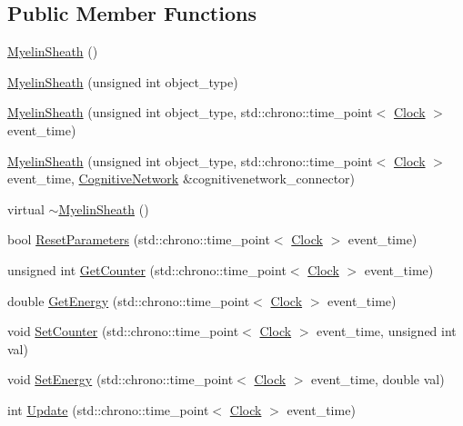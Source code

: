 \subsection*{Public Member Functions}
\begin{DoxyCompactItemize}
\item 
\mbox{\hyperlink{classMyelinSheath_a298d69acb8d64de018f32443ea015287}{Myelin\+Sheath}} ()
\item 
\mbox{\hyperlink{classMyelinSheath_a9f9f90c853f341b5cbf4f2c5035a14af}{Myelin\+Sheath}} (unsigned int object\+\_\+type)
\item 
\mbox{\hyperlink{classMyelinSheath_a34a80a57ebcde58933a07ca9d99780eb}{Myelin\+Sheath}} (unsigned int object\+\_\+type, std\+::chrono\+::time\+\_\+point$<$ \mbox{\hyperlink{universe_8h_a0ef8d951d1ca5ab3cfaf7ab4c7a6fd80}{Clock}} $>$ event\+\_\+time)
\item 
\mbox{\hyperlink{classMyelinSheath_aac107d8f22ca3c02f2d346f44950e6d0}{Myelin\+Sheath}} (unsigned int object\+\_\+type, std\+::chrono\+::time\+\_\+point$<$ \mbox{\hyperlink{universe_8h_a0ef8d951d1ca5ab3cfaf7ab4c7a6fd80}{Clock}} $>$ event\+\_\+time, \mbox{\hyperlink{classCognitiveNetwork}{Cognitive\+Network}} \&cognitivenetwork\+\_\+connector)
\item 
virtual \mbox{\hyperlink{classMyelinSheath_acf71a2a450e2df353f28eed6c7a4129a}{$\sim$\+Myelin\+Sheath}} ()
\item 
bool \mbox{\hyperlink{classMyelinSheath_af1174b93be36aa43506a4ba9857d92a4}{Reset\+Parameters}} (std\+::chrono\+::time\+\_\+point$<$ \mbox{\hyperlink{universe_8h_a0ef8d951d1ca5ab3cfaf7ab4c7a6fd80}{Clock}} $>$ event\+\_\+time)
\item 
unsigned int \mbox{\hyperlink{classMyelinSheath_a10eef8601d129e7e2f28e8ed1ebc975c}{Get\+Counter}} (std\+::chrono\+::time\+\_\+point$<$ \mbox{\hyperlink{universe_8h_a0ef8d951d1ca5ab3cfaf7ab4c7a6fd80}{Clock}} $>$ event\+\_\+time)
\item 
double \mbox{\hyperlink{classMyelinSheath_ac0c4142b6066e5982c54583e8ac01271}{Get\+Energy}} (std\+::chrono\+::time\+\_\+point$<$ \mbox{\hyperlink{universe_8h_a0ef8d951d1ca5ab3cfaf7ab4c7a6fd80}{Clock}} $>$ event\+\_\+time)
\item 
void \mbox{\hyperlink{classMyelinSheath_afb9cd377a71881558f48cf8bb226af77}{Set\+Counter}} (std\+::chrono\+::time\+\_\+point$<$ \mbox{\hyperlink{universe_8h_a0ef8d951d1ca5ab3cfaf7ab4c7a6fd80}{Clock}} $>$ event\+\_\+time, unsigned int val)
\item 
void \mbox{\hyperlink{classMyelinSheath_ad0f6dbae2819f6642a92b8e85ec8f775}{Set\+Energy}} (std\+::chrono\+::time\+\_\+point$<$ \mbox{\hyperlink{universe_8h_a0ef8d951d1ca5ab3cfaf7ab4c7a6fd80}{Clock}} $>$ event\+\_\+time, double val)
\item 
int \mbox{\hyperlink{classMyelinSheath_af53c8f36ee963168dec09b74a6be8e4c}{Update}} (std\+::chrono\+::time\+\_\+point$<$ \mbox{\hyperlink{universe_8h_a0ef8d951d1ca5ab3cfaf7ab4c7a6fd80}{Clock}} $>$ event\+\_\+time)
\end{DoxyCompactItemize}
